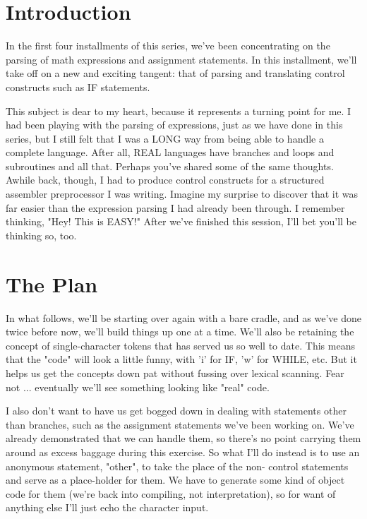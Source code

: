 \documentclass[float=false, crop=false]{standalone}
\begin{document}
\section{Introduction}

In the first four installments of this series, we've been concentrating on the
parsing of math expressions and assignment statements. In this installment,
we'll take off on a new and exciting tangent: that of parsing and translating
control constructs such as IF statements.

This subject is dear to my heart, because it represents a turning point for me.
I had been playing with the parsing of expressions, just as we have done in this
series, but I still felt that I was a LONG way from being able to handle a
complete language. After all, REAL languages have branches and loops and
subroutines and all that. Perhaps you've shared some of the same thoughts.
Awhile back, though, I had to produce control constructs for a structured
assembler preprocessor I was writing. Imagine my surprise to discover that it
was far easier than the expression parsing I had already been through. I
remember thinking, "Hey! This is EASY!" After we've finished this session, I'll
bet you'll be thinking so, too.


\section{The Plan}

In what follows, we'll be starting over again with a bare cradle, and as we've
done twice before now, we'll build things up one at a time. We'll also be
retaining the concept of single-character tokens that has served us so well to
date. This means that the "code" will look a little funny, with 'i' for IF, 'w'
for WHILE, etc. But it helps us get the concepts down pat without fussing over
lexical scanning. Fear not ... eventually we'll see something looking like
"real" code.

I also don't want to have us get bogged down in dealing with statements other
than branches, such as the assignment statements we've been working on. We've
already demonstrated that we can handle them, so there's no point carrying them
around as excess baggage during this exercise. So what I'll do instead is to use
an anonymous statement, "other", to take the place of the non- control
statements and serve as a place-holder for them. We have to generate some kind
of object code for them (we're back into compiling, not interpretation), so for
want of anything else I'll just echo the character input.
\end{document}
